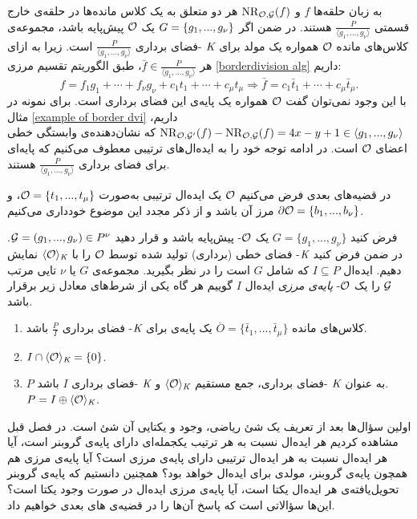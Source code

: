 \begin{remark}
به زبان حلقه‌ها 
$f$
و
$\operatorname{\mathrm{NR}}_{{\mathcal O},{\mathcal G}}(f)$
هر دو متعلق به یک کلاس مانده‌ها در حلقه‌ی خارج قسمتی 
$\frac{P}{\langle g_{1},...,g_{\nu} \rangle}$
هستند. در ضمن اگر 
$G = \{g_{1},...,g_{\nu}\}$
یک 
${\mathcal O}$
پیش‌پایه باشد، مجموعه‌ی کلاس‌های مانده  
${\mathcal O}$
همواره یک مولد برای 
$\textit{K}$
-فضای برداری 
$\frac{P}{\langle g_{1},...,g_{\nu} \rangle}$
است. زیرا به ازای هر 
$\bar{f}\in\frac{P}{\langle g_{1},...,g_{\nu} \rangle}$،
طبق الگوریتم تقسیم مرزی 
\ref{borderdivision alg}
داریم:
$$f = f_{1}g_{1}+\cdots+f_{\nu}g_{\nu} + c_{1}t_{1} +\cdots + c_{\mu}t_{\mu}\Rightarrow \bar{f} = c_{1}\bar{t}_{1} + \cdots + c_{\mu}\bar{t}_{\mu}.$$
با این وجود نمی‌توان گفت 
${\mathcal O}$
همواره یک پایه‌ی ‌این فضای برداری است. برای نمونه در مثال 
\ref{example of border dvi}
داریم، 
$\operatorname{\mathrm{NR}}_{{\mathcal O},{\mathcal G}'}(f) - \operatorname{\mathrm{NR}}_{{\mathcal O},{\mathcal G}}(f)  = 4x - y +1 \in\langle g_{1},...,g_{\nu}\rangle$
که نشان‌دهنده‌ی وابستگی خطی اعضای 
${\mathcal O}$
است.  در ادامه توجه خود را به ایده‌ال‌های ترتیبی  معطوف می‌کنیم که پایه‌ای برای فضای برداری 
$\frac{P}{\langle g_{1},...,g_{\nu}\rangle}$
هستند. 
\end{remark}
در قضیه‌های بعدی فرض می‌کنیم 
${\mathcal O}$
یک ایده‌ال ترتیبی به‌صورت 
${\mathcal O} = \{t_{1},...,t_{\mu}\}$،
و
$\partial\mathcal{O} = \{b_{1},...,b_{\nu}\}$
مرز آن باشد  و از ذکر مجدد این موضوع خودداری می‌کنیم. 
\begin{definition}
فرض کنید
$G = \{g_{1},...,g_{\nu}\}$
یک 
${\mathcal O}$-
پیش‌پایه باشد و قرار دهید 
${\mathcal G} = (g_{1},...,g_{\nu})\in P^{\nu}$.
در ضمن فرض کنید 
$\textit{K}$-
فضای خطی (برداری) تولید شده توسط 
${\mathcal O}$
را با 
$\langle{\mathcal O}\rangle_{\textit{K}}$
نمایش دهیم. ایده‌ال 
$I\subseteq P$
که شامل 
$G$
است را در نظر بگیرید. مجموعه‌ی 
$G$
یا 
$\nu$
تایی مرتب 
${\mathcal G}$
را یک 
${\mathcal O}$-
\textit{پایه‌ی مرزی}
ایده‌ال 
$I$
گوییم هر گاه یکی از شرط‌های معادل زیر برقرار باشد.
\begin{enumerate}
\item
کلاس‌های مانده 
$\overline{O} = \{\bar{t}_{1},...,\bar{t}_{\mu}\}$
یک پایه‌ی برای 
$\textit{K}$-
فضای برداری 
$\frac{P}{I}$
باشد. 
\item
$I\cap \langle {\mathcal O}\rangle_{\textit{K}} = \{0\}$.
\item
$P$
به عنوان
$\textit{K}$
-فضای برداری، جمع مستقیم 
$\langle{\mathcal O}\rangle_{\textit{K}}$
و 
$\textit{K}$
-فضای برداری 
$I$
باشد.
$P = I\oplus \langle {\mathcal O}\rangle_{\textit{K}}$.
\end{enumerate}
\end{definition}
اولین  سؤال‌ها بعد از تعریف یک شئ ریاضی، وجود و یکتایی آن شئ است. در فصل قبل مشاهده کردیم هر ایده‌ال نسبت به هر ترتیب یکجمله‌ای دارای پایه‌ی گروبنر است، آیا هر ایده‌ال نسبت به هر ایده‌ال ترتیبی دارای پایه‌ی مرزی است؟ آیا پایه‌ی مرزی هم همچون پایه‌ی گروبنر، مولدی برای ایده‌ال خواهد بود؟ همچنین دانستیم که پایه‌ی گروبنر تحویل‌یافته‌ی هر ایده‌ال یکتا است، آیا پایه‌ی مرزی ایده‌ال در صورت وجود یکتا است؟ این‌ها سؤالاتی است که پاسخ آن‌ها را در قضیه‌ی های بعدی خواهیم داد.

